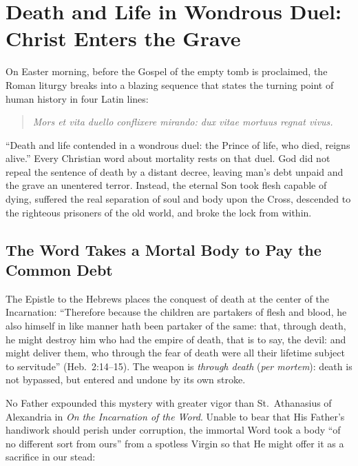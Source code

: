 \section{Death and Life in Wondrous Duel: Christ Enters the Grave}

On Easter morning, before the Gospel of the empty tomb is proclaimed, the Roman liturgy breaks into a blazing sequence that states the turning point of human history in four Latin lines:

\begin{quote}
\emph{Mors et vita duello conflixere mirando: dux vitae mortuus regnat vivus.}
\end{quote}

``Death and life contended in a wondrous duel: the Prince of life, who died, reigns alive.'' Every Christian word about mortality rests on that duel. God did not repeal the sentence of death by a distant decree, leaving man's debt unpaid and the grave an unentered terror. Instead, the eternal Son took flesh capable of dying, suffered the real separation of soul and body upon the Cross, descended to the righteous prisoners of the old world, and broke the lock from within.

\subsection{The Word Takes a Mortal Body to Pay the Common Debt}

The Epistle to the Hebrews places the conquest of death at the center of the Incarnation: ``Therefore because the children are partakers of flesh and blood, he also himself in like manner hath been partaker of the same: that, through death, he might destroy him who had the empire of death, that is to say, the devil: and might deliver them, who through the fear of death were all their lifetime subject to servitude'' (Heb.\ 2:14--15). The weapon is \emph{through death} (\emph{per mortem}): death is not bypassed, but entered and undone by its own stroke.

No Father expounded this mystery with greater vigor than St.~Athanasius of Alexandria in \emph{On the Incarnation of the Word}. Unable to bear that His Father's handiwork should perish under corruption, the immortal Word took a body ``of no different sort from ours'' from a spotless Virgin so that He might offer it as a sacrifice in our stead:

